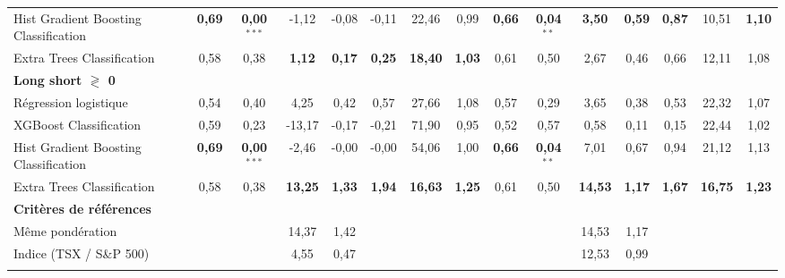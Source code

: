 \begin{table}[h]
{\begin{tabular}{l *{7}{S[table-format=3.2]} | *{7}{S[table-format=3.2]}}
Hist Gradient Boosting Classification & \bfseries\color{Green}0,69 & \bfseries\color{Green}0,00$^{***}$ & -1,12 & -0,08 & -0,11 & 22,46 & 0,99 & \bfseries\color{Green}0,66 & \bfseries\color{Green}0,04$^{**}$ & \bfseries\color{Green}3,50 & \bfseries\color{Green}0,59 & \bfseries\color{Green}0,87 & 10,51 & \bfseries\color{Green}1,10 \\ \addlinespace[0.1cm]
Extra Trees Classification & 0,58 & 0,38 & \bfseries\color{Green}1,12 & \bfseries\color{Green}0,17 & \bfseries\color{Green}0,25 & \bfseries\color{Green}18,40 & \bfseries\color{Green}1,03 & 0,61 & 0,50 & 2,67 & 0,46 & 0,66 & 12,11 & 1,08 \\ \addlinespace[0.1cm]
\textbf{Long short $\gtrless$ 0} &  &  &  &  &  &  &  &  &  &  &  &  &  & \\
\addlinespace[0.1cm]
Régression logistique & 0,54 & 0,40 & 4,25 & 0,42 & 0,57 & 27,66 & 1,08 & 0,57 & 0,29 & 3,65 & 0,38 & 0,53 & 22,32 & 1,07 \\ \addlinespace[0.1cm]
XGBoost Classification & 0,59 & 0,23 & -13,17 & -0,17 & -0,21 & 71,90 & 0,95 & 0,52 & 0,57 & 0,58 & 0,11 & 0,15 & 22,44 & 1,02 \\ \addlinespace[0.1cm]
Hist Gradient Boosting Classification & \bfseries\color{Green}0,69 & \bfseries\color{Green}0,00$^{***}$ & -2,46 & -0,00 & -0,00 & 54,06 & 1,00 & \bfseries\color{Green}0,66 & \bfseries\color{Green}0,04$^{**}$ & 7,01 & 0,67 & 0,94 & 21,12 & 1,13 \\ \addlinespace[0.1cm]
Extra Trees Classification & 0,58 & 0,38 & \bfseries\color{Green}13,25 & \bfseries\color{Green}1,33 & \bfseries\color{Green}1,94 & \bfseries\color{Green}16,63 & \bfseries\color{Green}1,25 & 0,61 & 0,50 & \bfseries\color{Green}14,53 & \bfseries\color{Green}1,17 & \bfseries\color{Green}1,67 & \bfseries\color{Green}16,75 & \bfseries\color{Green}1,23 \\ \addlinespace[0.1cm]
\textbf{Critères de références} &  &  &  &  &  &  &  &  &  &  &  &  &  & \\
\addlinespace[0.1cm]
Même pondération &  &  & 14,37 & 1,42 &  &  &  &  &  & 14,53 & 1,17 &  &  &  \\ \addlinespace[0.1cm]
Indice (TSX / S\&P 500) &  &  & 4,55 & 0,47 &  &  &  &  &  & 12,53 & 0,99 &  &  &  \\ \addlinespace[0.1cm]
\bottomrule
\end{tabular}}
\end{table}

